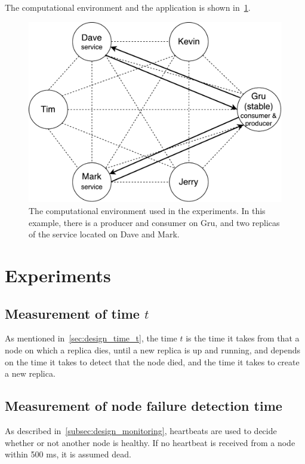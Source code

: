 \documentclass{cslthse-msc}
\begin{document}
The computational environment and the application is shown in~\cref{fig:evaluation_application}.

\begin{figure}[!hbt]
\centering
\includegraphics[scale=0.5]{images/evaluation_application.pdf} 
\caption{The computational environment used in the experiments. In this example, there is a producer and consumer on Gru, and two replicas of the service located on Dave and Mark.} \label{fig:evaluation_application}
\end{figure}


\section{Experiments}

\subsection{Measurement of time $t$} \label{sec:eval_time_t}
As mentioned in~\cref{sec:design_time_t}, the time $t$ is the time it takes from that a node on which a replica dies, until a new replica is up and running, and depends on the time it takes to detect that the node died, and the time it takes to create a new replica.

\subsection{Measurement of node failure detection time} \label{subsec:eval_node_fail_time}
As described in~\cref{subsec:design_monitoring}, heartbeats are used to decide whether or not another node is healthy. If no heartbeat is received from a node within 500 ms, it is assumed dead. 
\end{document}
